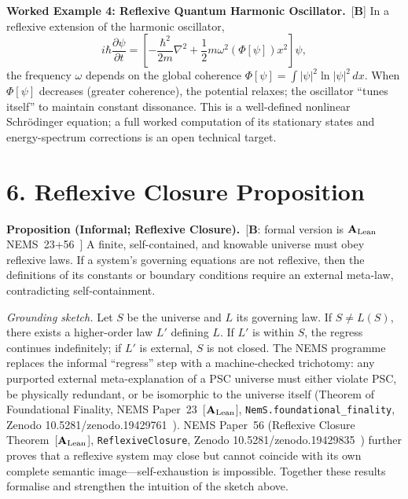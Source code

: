 \documentclass[11pt]{article}
\newcommand{\CatAL}{\ensuremath{\textbf{A}_{\rm Lean}}}
\newcommand{\CatB}{\textbf{B}}
\begin{document}
\vspace{0.3cm}

\textbf{Worked Example 4: Reflexive Quantum Harmonic Oscillator.}~[$\CatB$]
In a reflexive extension of the harmonic oscillator,
\[
i\hbar \frac{\partial \psi}{\partial t}
  = \left[-\frac{\hbar^2}{2m}\nabla^2
    + \frac{1}{2}m\omega^2(\Phi[\psi])x^2 \right]\psi,
\]
the frequency $\omega$ depends on the global coherence
$\Phi[\psi] = \int |\psi|^2 \ln |\psi|^2\,dx$.
When $\Phi[\psi]$ decreases (greater coherence), the potential relaxes;
the oscillator ``tunes itself'' to maintain constant dissonance.
This is a well-defined nonlinear Schr\"{o}dinger equation; a full
worked computation of its stationary states and energy-spectrum
corrections is an open technical target.

\section*{6. Reflexive Closure Proposition}

\textbf{Proposition (Informal; Reflexive Closure).}~[$\CatB$:
formal version is $\CatAL$ NEMS~23+56~\cite{SpivackNEMS23,SpivackNEMS56}]
A finite, self-contained, and knowable universe must obey reflexive
laws.
If a system's governing equations are not reflexive, then the
definitions of its constants or boundary conditions require an external
meta-law, contradicting self-containment.

\emph{Grounding sketch.}
Let \(S\) be the universe and \(L\) its governing law.
If \(S \ne L(S)\), there exists a higher-order law \(L'\) defining $L$.
If \(L'\) is within \(S\), the regress continues indefinitely; if
\(L'\) is external, \(S\) is not closed.
The NEMS programme replaces the informal ``regress'' step with a
machine-checked trichotomy: any purported external meta-explanation
of a PSC universe must either violate PSC, be physically redundant,
or be isomorphic to the universe itself (Theorem of Foundational
Finality, NEMS Paper~23~[$\CatAL$],
\texttt{NemS.foundational\_finality}, Zenodo
10.5281/\allowbreak zenodo.19429761~\cite{SpivackNEMS23}).
NEMS Paper~56 (Reflexive Closure Theorem~[$\CatAL$],
\texttt{ReflexiveClosure}, Zenodo
10.5281/\allowbreak zenodo.19429835~\cite{SpivackNEMS56})
further proves that a reflexive system may close but cannot
coincide with its own complete semantic image---self-exhaustion is
impossible.
Together these results formalise and strengthen the intuition of the
sketch above.
\end{document}
